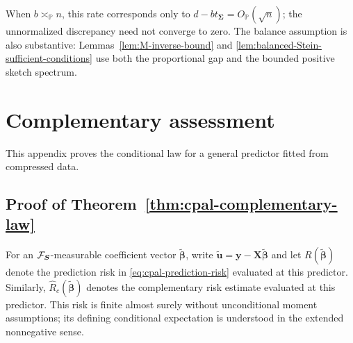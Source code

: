 \documentclass{article}
\theoremstyle{plain}
\theoremstyle{definition}
\theoremstyle{definition}
\def\P{{\mathbb{P}}}
\def\mathbold{\boldsymbol}
\def\bS{\mathbold{S}}\def\hbS{{\widehat{\bS}}}\def\tbS{{\widetilde{\bS}}}
\def\bu{\mathbold{u}}\def\uhat{\widehat{u}}\def\util{\widetilde{u}}\def\ubar{{\overline u}}
\def\bX{\mathbold{X}}\def\hbX{{\widehat{\bX}}}\def\tbX{{\tilde{\bX}}}\def\bXbar{{\overline \bX}}
\def\by{\mathbold{y}}\def\yhat{\widehat{y}}\def\ytil{\widetilde{y}}\def\ybar{{\overline y}}\def\vby{{\bf y}}
\def\bbeta{\mathbold{\beta}}\def\betahat{\widehat{\beta}}\def\hbeta{\widehat{\beta}}
\def\bSigma{\mathbold{\Sigma}}\def\hbSigma{{\widehat{\bSigma}}}
\begin{document}
When $b\asymp_{\P}n$, this rate corresponds only to
$d-bt_{\bSigma}=O_{\P}(\sqrt n)$; the unnormalized discrepancy need not
converge to zero.  The balance assumption is also substantive:
Lemmas~\ref{lem:M-inverse-bound} and
\ref{lem:balanced-Stein-sufficient-conditions} use both the proportional gap
and the bounded positive sketch spectrum.


















































\clearpage
\section{Complementary assessment}
\label{app:overparameterized-proofs}

This appendix proves the conditional law for a general predictor fitted
from compressed data.

\subsection{Proof of Theorem~\ref{thm:cpal-complementary-law}}
\label{app:proof-complementary-validation}

For an $\calF_{\bS}$-measurable coefficient vector
$\widetilde{\bbeta}$, write
$\widetilde{\bu}=\by-\bX\widetilde{\bbeta}$ and let
$R(\widetilde{\bbeta})$ denote the prediction risk in
\eqref{eq:cpal-prediction-risk} evaluated at this predictor.
Similarly, $\widehat R_c(\widetilde{\bbeta})$ denotes the complementary
risk estimate evaluated at this predictor.
This risk is finite almost surely without unconditional moment
assumptions; its defining conditional expectation is understood in the
extended nonnegative sense.
\end{document}
